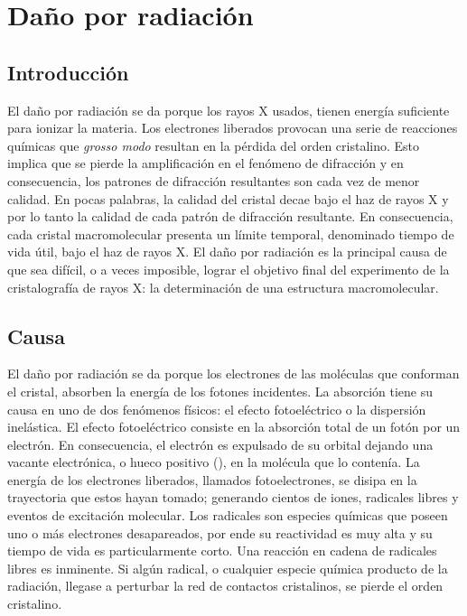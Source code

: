 \section{Daño por radiación}
\subsection{Introducción}
El daño por radiación se da porque los rayos X usados, tienen energía suficiente para ionizar la materia. Los electrones liberados provocan una serie de reacciones químicas que \emph{grosso modo} resultan en la pérdida del orden cristalino. Esto implica que se pierde la amplificación en el fenómeno de difracción y en consecuencia, los patrones de difracción resultantes son cada vez de menor calidad. En pocas palabras, la calidad del cristal decae bajo el haz de rayos X y por lo tanto la calidad de cada patrón de difracción resultante. En consecuencia, cada cristal macromolecular presenta un límite temporal, denominado tiempo de vida útil, bajo el haz de rayos X. El daño por radiación es la principal causa de que sea difícil, o a veces imposible, lograr el objetivo final del experimento de la cristalografía de rayos X: la determinación de una estructura macromolecular.
  
\subsection{Causa}
El daño por radiación se da porque los electrones de las moléculas que conforman el cristal, absorben la energía de los fotones incidentes. La absorción tiene su causa en uno de dos fenómenos físicos: el efecto fotoeléctrico o la dispersión inelástica. El efecto fotoeléctrico consiste en la absorción total de un fotón por un electrón. En consecuencia, el electrón es expulsado de su orbital dejando una vacante electrónica, o hueco positivo (), en la molécula que lo contenía. La energía de los electrones liberados, llamados fotoelectrones, se disipa en la trayectoria que estos hayan tomado; generando cientos de iones, radicales libres y eventos de excitación molecular. Los radicales son especies químicas que poseen uno o más electrones desapareados, por ende su reactividad es muy alta y su tiempo de vida es particularmente corto. Una reacción en cadena de radicales libres es inminente. Si algún radical, o cualquier especie química producto de la radiación, llegase a perturbar la red de contactos cristalinos, se pierde el orden cristalino. 
